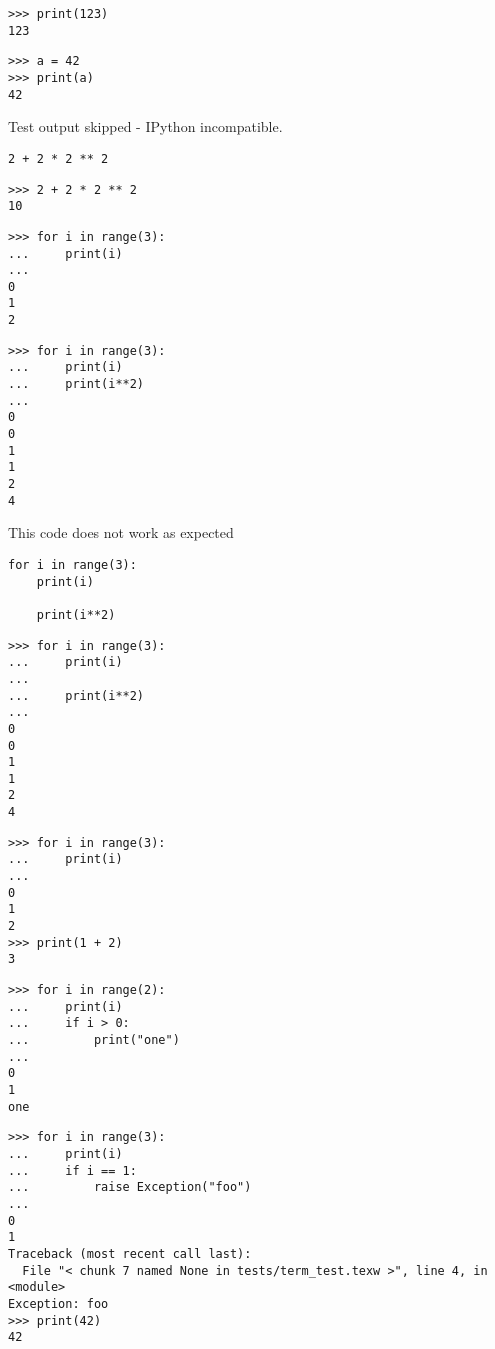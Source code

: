 
\begin{verbatim}
>>> print(123)
123

\end{verbatim}


\begin{verbatim}
>>> a = 42
>>> print(a)
42

\end{verbatim}

Test output skipped - IPython incompatible.
\begin{verbatim}
2 + 2 * 2 ** 2
\end{verbatim}

\begin{verbatim}
>>> 2 + 2 * 2 ** 2
10

\end{verbatim}


\begin{verbatim}
>>> for i in range(3):
...     print(i)
...
0
1
2

\end{verbatim}


\begin{verbatim}
>>> for i in range(3):
...     print(i)
...     print(i**2)
...
0
0
1
1
2
4

\end{verbatim}

This code does not work as expected
\begin{verbatim}
for i in range(3):
    print(i)

    print(i**2)
\end{verbatim}


\begin{verbatim}
>>> for i in range(3):
...     print(i)
...
...     print(i**2)
...
0
0
1
1
2
4

\end{verbatim}


\begin{verbatim}
>>> for i in range(3):
...     print(i)
...
0
1
2
>>> print(1 + 2)
3

\end{verbatim}


\begin{verbatim}
>>> for i in range(2):
...     print(i)
...     if i > 0:
...         print("one")
...
0
1
one

\end{verbatim}


\begin{verbatim}
>>> for i in range(3):
...     print(i)
...     if i == 1:
...         raise Exception("foo")
...
0
1
Traceback (most recent call last):
  File "< chunk 7 named None in tests/term_test.texw >", line 4, in
<module>
Exception: foo
>>> print(42)
42

\end{verbatim}


